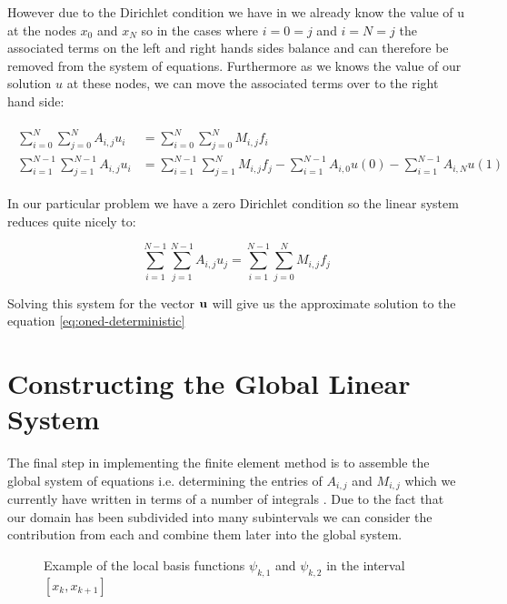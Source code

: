 However due to the Dirichlet condition we have in
 we already know the value of u at the nodes
$x_0$ and $x_N$ so in the cases where $i = 0 = j$ and $i = N = j$ the
associated terms on the left and right hands sides balance and can therefore be
removed from the system of equations. Furthermore as we knows the value of our
solution $u$ at these nodes, we can move the associated terms over to the right
hand side:

\begin{align}
  \begin{split}
    \sum_{i=0}^N\sum_{j=0}^NA_{i,j}u_i &= \sum_{i=0}^N\sum_{j=0}^NM_{i,j}f_i \\
    \sum_{i=1}^{N-1}\sum_{j=1}^{N-1}A_{i,j}u_i &= \sum_{i=1}^{N-1}\sum_{j=1}^{N}M_{i,j}f_j
                                                - \sum_{i=1}^{N-1}A_{i,0}u(0)
                                                - \sum_{i=1}^{N-1}A_{i,N}u(1)
  \end{split}
\end{align}

In our particular problem we have a zero Dirichlet condition so the linear
system reduces quite nicely to:

\begin{equation}\label{eq:oned-deterministic-fem}
    \sum_{i=1}^{N-1}\sum_{j=1}^{N-1}A_{i,j}u_j = \sum_{i=1}^{N-1}\sum_{j=0}^NM_{i,j}f_j
\end{equation}

Solving this system for the vector $\mathbf{u}$ will give us the approximate
solution to the equation \ref{eq:oned-deterministic}

\section{Constructing the Global Linear System}

The final step in implementing the finite element method is to assemble the
global system of equations i.e.  determining the entries of $A_{i,j}$ and
$M_{i,j}$ which we currently have written in terms of a number of integrals
. Due to the fact that our domain has
been subdivided into many subintervals we can consider the contribution from
each and combine them later into the global system.

\begin{figure}
\centering

\caption{Example of the local basis functions $\psi_{k,1}$ and $\psi_{k,2}$
         in the interval $[x_k, x_{k + 1}]$}
\label{fig:oned-local-basis}
\end{figure}


